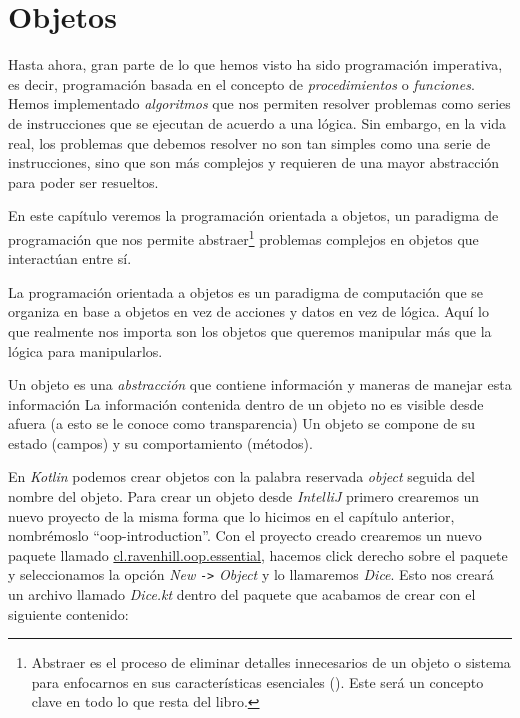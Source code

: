 \section{Objetos}
  Hasta ahora, gran parte de lo que hemos visto ha sido programación imperativa, es decir,
  programación basada en el concepto de \textit{procedimientos} o \textit{funciones}.
  Hemos implementado \textit{algoritmos} que nos permiten resolver problemas como series de
  instrucciones que se ejecutan de acuerdo a una lógica.
  Sin embargo, en la vida real, los problemas que debemos resolver no son tan simples como
  una serie de instrucciones, sino que son más complejos y requieren de una mayor abstracción
  para poder ser resueltos.

  En este capítulo veremos la programación orientada a objetos, un paradigma de programación
  que nos permite abstraer\footnote{
    Abstraer es el proceso de eliminar detalles innecesarios de un objeto o sistema para 
    enfocarnos en sus características esenciales (\cite{ObjectorientedProgramming2023}).
    Este será un concepto clave en todo lo que resta del libro.
  } problemas complejos en objetos que interactúan entre sí.

  \begin{defaultbox}
    La programación orientada a objetos es un paradigma de computación que se organiza en base a 
    objetos en vez de acciones y datos en vez de lógica.
    Aquí lo que realmente nos importa son los objetos que queremos manipular más que la lógica para
    manipularlos.
  \end{defaultbox}
  
  Un objeto es una \textit{abstracción} que contiene información y maneras de manejar esta información
  La información contenida dentro de un objeto no es visible desde afuera (a esto se le conoce como transparencia)
  Un objeto se compone de su estado (campos) y su comportamiento (métodos).

  En \textit{Kotlin} podemos crear objetos con la palabra reservada \textit{object} seguida del 
  nombre del objeto.
  Para crear un objeto desde \textit{IntelliJ} primero crearemos un nuevo proyecto de la misma forma
  que lo hicimos en el capítulo anterior, nombrémoslo \enquote{oop-introduction}.
  Con el proyecto creado crearemos un nuevo paquete llamado \url{cl.ravenhill.oop.essential}, 
  hacemos click derecho sobre el paquete y seleccionamos la opción \textit{New} \texttt{->} 
  \textit{Object} y lo llamaremos \textit{Dice}.
  Esto nos creará un archivo llamado \textit{Dice.kt} dentro del paquete que acabamos de crear con
  el siguiente contenido:

